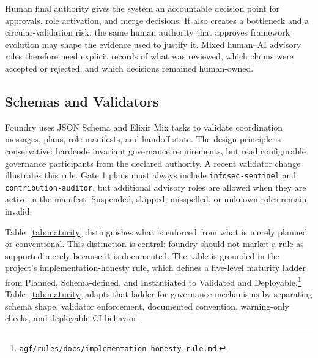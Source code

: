 \documentclass[conference]{IEEEtran}
\begin{document}
Human final authority gives the system an accountable decision point for approvals, role activation, and merge decisions. It also creates a bottleneck and a circular-validation risk: the same human authority that approves framework evolution may shape the evidence used to justify it. Mixed human--AI advisory roles therefore need explicit records of what was reviewed, which claims were accepted or rejected, and which decisions remained human-owned.

\subsection{Schemas and Validators}

Foundry uses JSON Schema and Elixir Mix tasks to validate coordination messages, plans, role manifests, and handoff state. The design principle is conservative: hardcode invariant governance requirements, but read configurable governance participants from the declared authority. A recent validator change illustrates this rule. Gate 1 plans must always include \texttt{infosec-sentinel} and \texttt{contribution-auditor}, but additional advisory roles are allowed when they are active in the manifest. Suspended, skipped, misspelled, or unknown roles remain invalid.

Table~\ref{tab:maturity} distinguishes what is enforced from what is merely planned or conventional. This distinction is central: foundry should not market a rule as supported merely because it is documented. The table is grounded in the project's implementation-honesty rule, which defines a five-level maturity ladder from Planned, Schema-defined, and Instantiated to Validated and Deployable.\footnote{\texttt{agf/rules/docs/implementation-honesty-rule.md}.} Table~\ref{tab:maturity} adapts that ladder for governance mechanisms by separating schema shape, validator enforcement, documented convention, warning-only checks, and deployable CI behavior.
\end{document}
